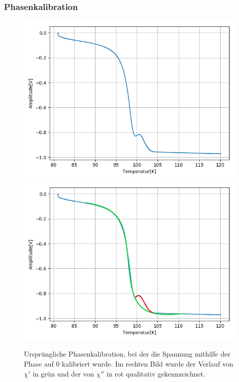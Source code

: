 \documentclass[12pt,a4paper]{article}
\begin{document}
\subsubsection{Phasenkalibration}
\begin{figure}[H]
\centering
\includegraphics[scale=0.5]{Bilder/Haupt_Supra/Kalialt.png}
\includegraphics[scale=0.5]{Bilder/Haupt_Supra/Kalialt_2.png}
\caption{Ursprüngliche Phasenkalibration, bei der die Spannung mithilfe der Phase auf 0 kalibriert wurde. Im rechten Bild wurde der Verlauf von $\chi'$ in grün und der von $\chi''$ in rot qualitativ gekennzeichnet.}
\label{fig:Supra_Kalialt}
\end{figure}
\end{document}
